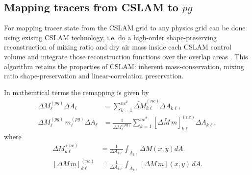 \subsection{Mapping tracers from CSLAM to $pg$}
For mapping tracer state from the CSLAM grid to any physics grid can be done using exising CSLAM technology, i.e. do a high-order shape-preserving reconstruction of mixing ratio and dry air mass inside each CSLAM control volume and integrate those reconstruction functions over the overlap areas \citep{LNU2010JCP,NL2010JCP}. This algorithm retains the properties of CSLAM: inherent mass-conservation, mixing ratio shape-preservation and linear-correlation preservation. 

In mathemtical terms the remapping is given by
\begin{eqnarray}
\Delta M^{(pg)}_{\ell}\Delta A_{\ell} &=\sum_{k=1}^{nc^2}\widetilde{\Delta M}^{(nc)}_{k\ell} \Delta A_{k\ell},\\
\Delta M^{(pg)}_{\ell}\, m^{(pg)}_{\ell}\Delta A_{\ell}&=\frac{1}{\Delta M^{(pg)}_{\ell}}\sum_{k=1}^{nc^2}\left[ \widetilde{\Delta M \, m}\right]^{(nc)}_{k\ell} \Delta A_{k\ell},
\end{eqnarray}
where 
\begin{eqnarray}
\Delta M^{(nc)}_{k\ell} &= \frac{1}{\Delta A_{k\ell}}\int_{A_{k\ell}}\Delta M(x,y)dA.\\
{\left[ \Delta M\, m\right]}^{(nc)}_{k\ell} &=\frac{1}{\Delta A_{k\ell}}\int_{A_{k\ell}}\left[ \Delta M\, m\right] (x,y)\, dA.
\end{eqnarray}


